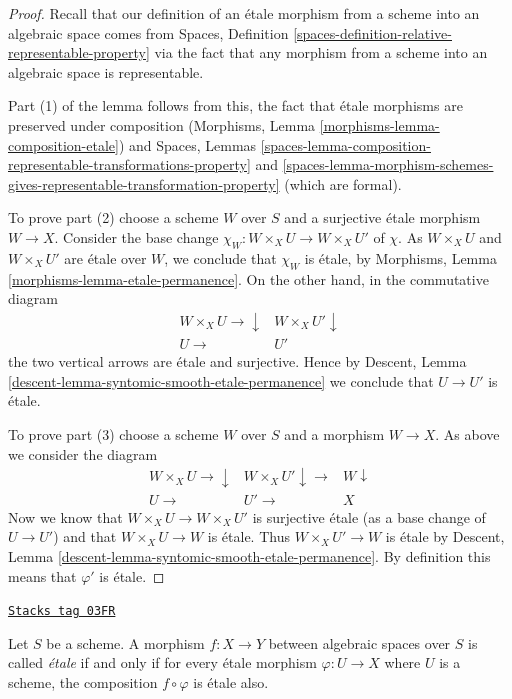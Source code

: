 \begin{proof}
Recall that our definition of an \'etale morphism from a scheme into an
algebraic space comes from
Spaces, Definition
\ref{spaces-definition-relative-representable-property}
via the fact that any morphism from a scheme into an algebraic space
is representable.

\medskip\noindent
Part (1) of the lemma follows from this, the fact that
\'etale morphisms are preserved under composition
(Morphisms, Lemma
\ref{morphisms-lemma-composition-etale})
and
Spaces, Lemmas
\ref{spaces-lemma-composition-representable-transformations-property} and
\ref{spaces-lemma-morphism-schemes-gives-representable-transformation-property}
(which are formal).

\medskip\noindent
To prove part (2) choose a scheme $W$ over $S$ and a
surjective \'etale morphism $W \to X$. Consider the base change
$\chi_W : W \times_X U \to W \times_X U'$ of $\chi$.
As $W \times_X U$ and $W \times_X U'$ are \'etale over $W$, we conclude that
$\chi_W$ is \'etale, by
Morphisms, Lemma \ref{morphisms-lemma-etale-permanence}.
On the other hand, in the commutative diagram
$$
\begin{array}{cc}W \times_X U \longrightarrow\downarrow & W \times_X U' \downarrow \\ U \longrightarrow & U'\end{array}
$$
the two vertical arrows are \'etale and surjective.
Hence by
Descent, Lemma \ref{descent-lemma-syntomic-smooth-etale-permanence}
we conclude that $U \to U'$ is \'etale.

\medskip\noindent
To prove part (3) choose a scheme $W$ over $S$ and a morphism $W \to X$.
As above we consider the diagram
$$
\begin{array}{ccc}W \times_X U \longrightarrow\downarrow & W \times_X U' \downarrow\longrightarrow & W \downarrow \\ U \longrightarrow & U' \longrightarrow & X\end{array}
$$
Now we know that $W \times_X U \to W \times_X U'$ is surjective \'etale
(as a base change of $U \to U'$)
and that $W \times_X U \to W$ is \'etale. Thus $W \times_X U' \to W$
is \'etale by Descent, Lemma
\ref{descent-lemma-syntomic-smooth-etale-permanence}. By definition
this means that $\varphi'$ is \'etale.
\end{proof}

\begin{definition}[Etale]
\label{spaces-properties-definition-etale}
\href{https://stacks.math.columbia.edu/tag/03FR}{\texttt{Stacks tag 03FR}}

Let $S$ be a scheme.
A morphism $f : X \to Y$ between algebraic spaces over $S$ is
called {\it \'etale} if and only if for every \'etale morphism
$\varphi : U \to X$ where $U$ is a scheme, the composition
$f \circ \varphi$ is \'etale also.
\end{definition}

